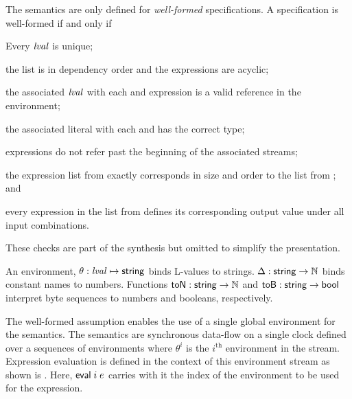 The semantics are only defined for \emph{well-formed} specifications. A specification is well-formed if and only if
\begin{compactenum}
\item Every $\mathit{lval}$ is unique;
\item the  list is in dependency order and the expressions are acyclic;
\item the associated $\mathit{lval}$ with each  and  expression is a valid reference in the environment;
\item the associated literal with each  and  has the correct type;
\item {} expressions do not refer past the beginning of the associated streams;
\item the expression list from  exactly corresponds in size and order to the list from ; and
\item every expression in the list from  defines its corresponding output value under all input combinations.
\end{compactenum}
These checks are part of the synthesis but omitted to simplify the presentation.

An environment, $\theta: \mathit{lval} \mapsto \mathsf{string}$ binds L-values to strings. $\Delta : \mathsf{string} \to \mathbb{N}$ binds constant names to numbers. Functions $\mathsf{toN}:\mathsf{string}\to\mathbb{N}$ and $\mathsf{toB}:\mathsf{string}\to\mathsf{bool}$ interpret byte sequences to numbers and booleans, respectively. 

The well-formed assumption enables the use of a single global environment for the semantics. The semantics are synchronous data-flow on a single clock defined over a sequences of environments where $\theta^i$ is the $i^\mathrm{th}$ environment in the stream. Expression evaluation is defined in the context of this environment stream as shown is . Here, $\mathsf{eval}\; i\; e$ carries with it the index of the environment to be used for the expression.

